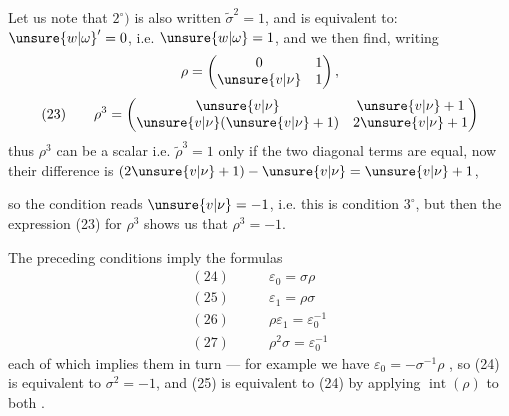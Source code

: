 
Let us note that $2^\circ)$ is also written $\widetilde\sigma^2=1$, and is equivalent to: $\unsure{w|\omega}'=0$, i.e. $\unsure{w|\omega}=1$, and we then find, writing \deleted{\unsure{$\rho=$}} 
\[
\rho=\begin{pmatrix}0&1\\\unsure{v|\nu}&1\end{pmatrix},
\]
\[
(23)\qquad
\rho^3=\begin{pmatrix}\unsure{v|\nu}&\unsure{v|\nu}+1\\\unsure{v|\nu}(\unsure{v|\nu}+1)&2\unsure{v|\nu}+1\end{pmatrix}
\]
thus $\rho^3$ can be a scalar i.e. $\widetilde\rho^3=1$ only if the two diagonal terms are equal, now their difference is $(2\unsure{v|\nu}+1)-\unsure{v|\nu}=\unsure{v|\nu}+1$,



so the condition reads $\unsure{v|\nu}=-1$, i.e. this is condition $3^\circ$, but then the expression (23) for $\rho^3$ shows us that $\rho^3=-1$.

\uline{} The preceding conditions imply the formulas
\[
\begin{aligned}
(24)\qquad &\varepsilon_0=\sigma\rho\\
(25)\qquad &\varepsilon_1=\rho\sigma\\
(26)\qquad &\rho\varepsilon_1=\varepsilon_0^{-1}\\
(27)\qquad &\rho^2\sigma=\varepsilon_0^{-1}
\end{aligned}
\]
each of which  implies them in turn
--- for example we have $\varepsilon_0=-\sigma^{-1}\rho$ , so (24) is equivalent to  $\sigma^2=-1$, and (25) is equivalent to (24) by applying $\operatorname{int}(\rho)$ to both .

